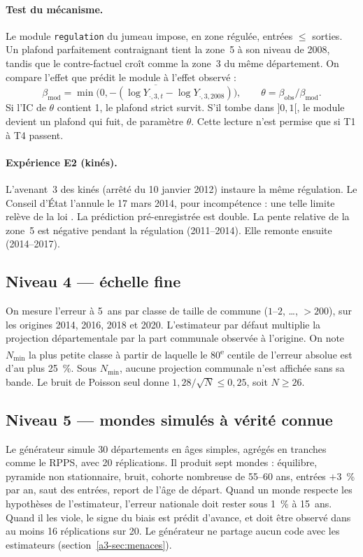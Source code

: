 \paragraph{Test du mécanisme.} Le module \texttt{regulation} du jumeau impose, en zone régulée,
entrées $\le$ sorties. Un plafond parfaitement contraignant tient la zone~5 à son niveau de 2008,
tandis que le contre-factuel croît comme la zone~3 du même département. On compare l'effet que
prédit le module à l'effet observé :
\[
  \beta_{\text{mod}} = \overline{\min\bigl(0, -(\log Y_{\cdot,3,t} - \log Y_{\cdot,3,2008})\bigr)},
  \qquad \theta = \beta_{\text{obs}} / \beta_{\text{mod}} .
\]
Si l'IC de $\theta$ contient 1, le plafond strict survit. S'il tombe dans $]0, 1[$, le module devient
un plafond qui fuit, de paramètre $\theta$. Cette lecture n'est permise que si T1 à T4 passent.

\paragraph{Expérience E2 (kinés).} L'avenant~3 des kinés (arrêté du 10 janvier 2012) instaure la même
régulation. Le Conseil d'État l'annule le 17 mars 2014, pour incompétence : une telle limite relève
de la loi \citep{a3-ce2014mk}. La prédiction pré-enregistrée est double. La pente relative de la zone~5
est négative pendant la régulation (2011--2014). Elle remonte ensuite (2014--2017).

\subsection{Niveau 4 --- échelle fine}
On mesure l'erreur à 5~ans par classe de taille de commune ($1$--$2$, \dots, $>200$), sur les
origines 2014, 2016, 2018 et 2020. L'estimateur par défaut multiplie la projection départementale
par la part communale observée à l'origine. On note $N_{\min}$ la plus petite classe à partir de
laquelle le 80\textsuperscript{e} centile de l'erreur absolue est d'au plus 25\suppose{}~\%. Sous
$N_{\min}$, aucune projection communale n'est affichée sans sa bande. Le bruit de Poisson seul
donne $1{,}28/\sqrt{N} \le 0{,}25$, soit $N \ge 26$\derive{}.

\subsection{Niveau 5 --- mondes simulés à vérité connue}
Le générateur simule 30 départements en âges simples, agrégés en tranches comme le RPPS, avec
20 réplications. Il produit sept mondes : équilibre, pyramide non stationnaire, bruit, cohorte
nombreuse de 55--60 ans, entrées $+3$~\% par an, saut des entrées, report de l'âge de départ.
Quand un monde respecte les hypothèses de l'estimateur, l'erreur nationale doit rester sous
1\suppose{}~\% à 15~ans. Quand il les viole, le signe du biais est prédit d'avance, et doit être
observé dans au moins 16 réplications sur 20. Le générateur ne partage aucun code avec les
estimateurs (section~\ref{a3-sec:menaces}).

